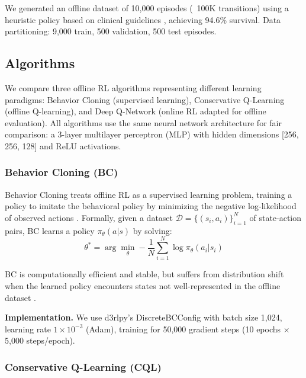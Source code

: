 We generated an offline dataset of 10,000 episodes (~100K transitions) using a heuristic policy based on clinical guidelines \citep{rhodes2017ssc, seymour2017sepsis_criteria}, achieving 94.6\% survival. Data partitioning: 9,000 train, 500 validation, 500 test episodes.

\subsection{Algorithms}\label{sec:methods:algos}

We compare three offline RL algorithms representing different learning paradigms: Behavior Cloning (supervised learning), Conservative Q-Learning (offline Q-learning), and Deep Q-Network (online RL adapted for offline evaluation). All algorithms use the same neural network architecture for fair comparison: a 3-layer multilayer perceptron (MLP) with hidden dimensions [256, 256, 128] and ReLU activations.

\subsubsection{Behavior Cloning (BC)}

Behavior Cloning treats offline RL as a supervised learning problem, training a policy to imitate the behavioral policy by minimizing the negative log-likelihood of observed actions \citep{pomerleau1991bc}. Formally, given a dataset $\mathcal{D} = \{(s_i, a_i)\}_{i=1}^N$ of state-action pairs, BC learns a policy $\pi_{\theta}(a|s)$ by solving:
\begin{equation}
\theta^* = \arg\min_{\theta} -\frac{1}{N} \sum_{i=1}^N \log \pi_{\theta}(a_i | s_i)
\end{equation}

BC is computationally efficient and stable, but suffers from distribution shift when the learned policy encounters states not well-represented in the offline dataset \citep{ross2010dagger}.

\textbf{Implementation.} We use d3rlpy's DiscreteBCConfig with batch size 1,024, learning rate $1 \times 10^{-3}$ (Adam), training for 50,000 gradient steps (10 epochs $\times$ 5,000 steps/epoch).

\subsubsection{Conservative Q-Learning (CQL)}

